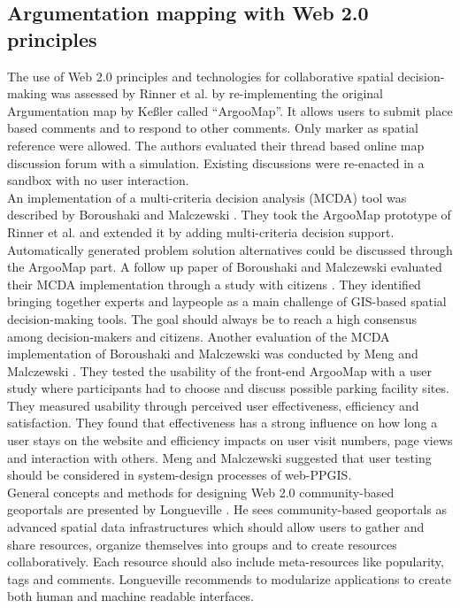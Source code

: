 \subsection{Argumentation mapping with Web 2.0 principles}
\label{zweifuenf}
The use of Web 2.0 principles and technologies for collaborative spatial decision-making was assessed by Rinner \cite{Rinner2009_Web2_argumap} et al. by re-implementing the original Argumentation map by Ke{\ss}ler \cite{Kessler2005_ArgumentationMapPrototype} called ``ArgooMap''. It allows users to submit place based comments and to respond to other comments. Only marker as spatial reference were allowed. The authors evaluated their thread based online map discussion forum with a simulation. Existing discussions were re-enacted in a sandbox with no user interaction.\\
An implementation of a multi-criteria decision analysis (MCDA) tool was described by Boroushaki and Malczewski \cite{Boroushaki2010_ParticipatoryGIS}. They took the ArgooMap prototype of Rinner et al. \cite{Rinner2009_Web2_argumap} and extended it by adding multi-criteria decision support. Automatically generated problem solution alternatives could be discussed through the ArgooMap part. A follow up paper of Boroushaki and Malczewski evaluated their MCDA implementation through a study with citizens \cite{Boroushaki2010_Consensus_measurement}. They identified bringing together experts and laypeople as a main challenge of GIS-based spatial decision-making tools. The goal should always be to reach a high consensus among decision-makers and citizens. Another evaluation of the MCDA implementation of Boroushaki and Malczewski was conducted by Meng and Malczewski \cite{Meng2010_ArgooMap_evaluation}. They tested the usability of the front-end ArgooMap with a user study where participants had to choose and discuss possible parking facility sites. They measured usability through perceived user effectiveness, efficiency and satisfaction. They found that effectiveness has a strong influence on how long a user stays on the website and efficiency impacts on user visit numbers, page views and interaction with others. Meng and Malczewski suggested that user testing should be considered in system-design processes of web-PPGIS.\\
General concepts and methods for designing Web 2.0 community-based geoportals are presented by Longueville \cite{Longueville2010_community_based_geoportals_web20}. He sees community-based geoportals as advanced spatial data infrastructures which should allow users to gather and share resources, organize themselves into groups and to create resources collaboratively. Each resource should also include meta-resources like popularity, tags and comments. Longueville recommends to modularize applications to create both human and machine readable interfaces.\\
